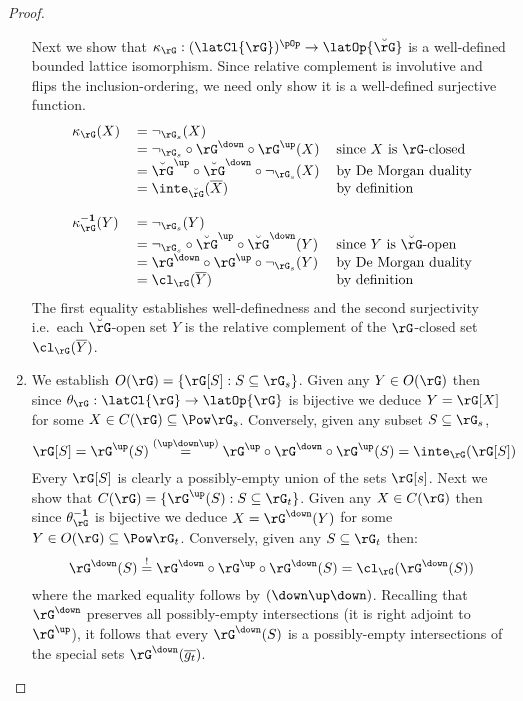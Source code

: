 \documentclass{article}
\begin{document}
\begin{proof}
\begin{enumerate}
Next we show that $\kappa_\rG : (\latCl{\rG})^{\pOp} \to \latOp{\breve{\rG}}$ is a well-defined bounded lattice isomorphism. Since relative complement is involutive and flips the inclusion-ordering, we need only show it is a well-defined surjective function.
\[
\begin{tabular}{lll}
$\kappa_\rG(X)$
&
$= \neg_{\rG_s}(X)$
\\&
$= \neg_{\rG_s} \circ \rG^\down \circ \rG^\up(X)$
& since $X$ is $\rG$-closed
\\&
$= \breve{\rG}^\up \circ \breve{\rG}^\down \circ \neg_{\rG_s} (X)$
& by De Morgan duality
\\&
$= \inte_{\breve{\rG}}(\overline{X})$
& by definition
\\
\\
$\kappa_\rG^{\bf-1}(Y)$
&
$= \neg_{\rG_s}(Y)$
\\&
$= \neg_{\rG_s} \circ \breve{\rG}^\up \circ \breve{\rG}^\down(Y)$
& since $Y$ is $\breve{\rG}$-open
\\&
$= \rG^\down \circ \rG^\up \circ \neg_{\rG_s} (Y)$
& by De Morgan duality
\\&
$= \cl_{\rG}(\overline{Y})$
& by definition
\end{tabular}
\]
The first equality establishes well-definedness and the second surjectivity i.e.\ each $\breve{\rG}$-open set $Y$ is the relative complement of the $\rG$-closed set $\cl_\rG(\overline{Y})$.

\item
We establish $O(\rG) = \{ \rG[S] : S \subseteq \rG_s \}$. Given any $Y \in O(\rG)$ then since $\theta_\rG : \latCl{\rG} \to \latOp{\rG}$ is bijective we deduce $Y = \rG[X]$ for some $X \in C(\rG) \subseteq \Pow\rG_s$. Conversely, given any subset $S \subseteq \rG_s$,
\[
\rG[S] 
= \rG^\up(S) 
\stackrel{(\up\down\up)}{=} \rG^\up \circ \rG^\down \circ \rG^\up(S) 
= \inte_\rG(\rG[S])
\]
Every $\rG[S]$ is clearly a possibly-empty union of the sets $\rG[s]$. Next we show that $C(\rG) = \{ \rG^\up(S) : S \subseteq \rG_t \}$. Given any $X \in C(\rG)$ then since $\theta_\rG^{\bf-1}$ is bijective we deduce $X = \rG^\down(Y)$ for some $Y \in O(\rG) \subseteq \Pow\rG_t$. Conversely, given any $S \subseteq \rG_t$ then:
\[
\rG^\down(S) 
\stackrel{!}{=} \rG^\down \circ \rG^\up \circ \rG^\down(S) 
= \cl_\rG(\rG^\down(S))
\]
where the marked equality follows by $(\down\up\down)$. Recalling that $\rG^\down$ preserves all possibly-empty intersections (it is right adjoint to $\rG^\up$), it follows that every $\rG^\down(S)$ is a possibly-empty intersections of the special sets $\rG^\down(\overline{g_t})$.


\end{enumerate}
\end{proof}
\end{document}
